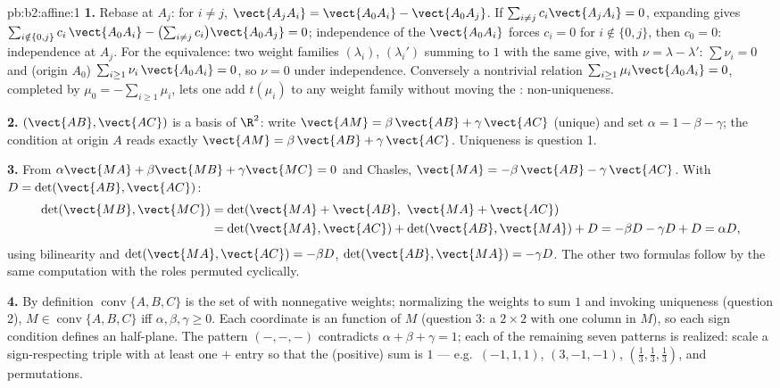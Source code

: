 \begin{solution}{pb:b2:affine:1}
\textbf{1.} Rebase at $A_j$: for $i \neq j$, $\vect{A_jA_i} =
\vect{A_0A_i} - \vect{A_0A_j}$. If $\sum_{i \neq j}
c_i\vect{A_jA_i} = 0$, expanding gives $\sum_{i \notin \{0,
j\}} c_i\,\vect{A_0A_i} - \bigl(\sum_{i\neq j}
c_i\bigr)\vect{A_0A_j} = 0$; independence of the
$\vect{A_0A_i}$ forces $c_i = 0$ for $i \notin \{0, j\}$, then
$c_0 = 0$: independence at $A_j$. For the equivalence: two
weight families $(\lambda_i)$, $(\lambda_i')$ summing to $1$
with the same  give, with $\nu = \lambda -
\lambda'$: $\sum\nu_i = 0$ and (origin $A_0$) $\sum_{i \geq
1}\nu_i\,\vect{A_0A_i} = 0$, so $\nu = 0$ under independence.
Conversely a nontrivial relation $\sum_{i\geq1}\mu_i
\vect{A_0A_i} = 0$, completed by $\mu_0 = -\sum_{i\geq1}
\mu_i$, lets one add $t(\mu_i)$ to any weight family without
moving the : non-uniqueness.

\textbf{2.} $(\vect{AB}, \vect{AC})$ is a basis of $\R^2$:
write $\vect{AM} = \beta\,\vect{AB} + \gamma\,\vect{AC}$
(unique) and set $\alpha = 1 - \beta - \gamma$; the 
condition at origin $A$ reads exactly $\vect{AM} =
\beta\,\vect{AB} + \gamma\,\vect{AC}$. Uniqueness is question
1.

\textbf{3.} From $\alpha\vect{MA} + \beta\vect{MB} +
\gamma\vect{MC} = 0$ and Chasles, $\vect{MA} =
-\beta\,\vect{AB} - \gamma\,\vect{AC}$. With $D =
\det(\vect{AB}, \vect{AC})$:
\begin{align*}
\det(\vect{MB}, \vect{MC})
&= \det(\vect{MA} + \vect{AB},\ \vect{MA} + \vect{AC})\\
&= \det(\vect{MA}, \vect{AC}) + \det(\vect{AB}, \vect{MA}) +
D = -\beta D - \gamma D + D = \alpha D,
\end{align*}
using bilinearity and $\det(\vect{MA}, \vect{AC}) = -\beta D$,
$\det(\vect{AB}, \vect{MA}) = -\gamma D$. The other two
formulas follow by the same computation with the roles
permuted cyclically.

\textbf{4.} By definition $\operatorname{conv}\{A, B, C\}$ is
the set of  with nonnegative weights; normalizing
the weights to sum $1$ and invoking uniqueness (question 2),
$M \in \operatorname{conv}\{A,B,C\}$ iff $\alpha, \beta,
\gamma \geq 0$. Each coordinate is an  function of $M$
(question 3: a $2\times2$  with one column 
in $M$), so each  sign condition defines an 
half-plane. The pattern $(-,-,-)$ contradicts $\alpha + \beta
+ \gamma = 1$; each of the remaining seven patterns is
realized: scale a sign-respecting triple with at least one
$+$ entry so that the (positive) sum is $1$ --- e.g.\
$(-1, 1, 1)$, $(3, -1, -1)$, $(\frac13, \frac13, \frac13)$,
and permutations.


\end{solution}

